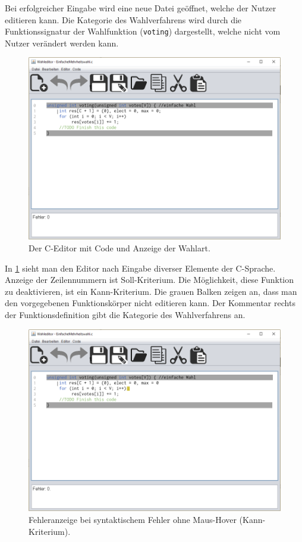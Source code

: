 \documentclass[a4paper]{scrreprt}
\begin{document}
Bei erfolgreicher Eingabe wird eine neue Datei geöffnet, welche der Nutzer editieren kann. Die Kategorie des Wahlverfahrens wird durch die Funktionssignatur der Wahlfunktion (\texttt{voting}) dargestellt, welche nicht vom Nutzer verändert werden kann. 

\begin{figure}[H]
\includegraphics[scale=0.4]{Editor-mit-text.png}
\caption{Der C-Editor mit Code und Anzeige der Wahlart.}
\label{Editor-mit-text}
\end{figure}

In \ref{Editor-mit-text} sieht man den Editor nach Eingabe diverser Elemente der C-Sprache. Anzeige der Zeilennummern ist Soll-Kriterium. Die Möglichkeit, diese Funktion zu deaktivieren, ist ein Kann-Kriterium. Die grauen Balken zeigen an, dass man den vorgegebenen Funktionskörper nicht editieren kann. Der Kommentar rechts der Funktionsdefinition gibt die Kategorie des Wahlverfahrens an.

\begin{figure}[H]
\includegraphics[scale=0.4]{Editor-mit-Fehler-ohne-hover.png}
\caption{Fehleranzeige bei syntaktischem Fehler ohne Maus-Hover (Kann-Kriterium).}
\label{Editor-mit-Fehler-ohne-hover}
\end{figure}
\end{document}
